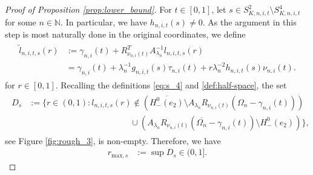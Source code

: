 \documentclass[11pt]{article}
\numberwithin{statement}{section}
\numberwithin{equation}{section}
\theoremstyle{remark}
\newcommand{\N}{\mathbb N}
\begin{document}
\begin{proof}[Proof of Proposition \ref{prop:lower_bound}]
        For $t\in [0,1]$, let
        $s \in S^2_{K,n,i,t} \setminus S^4_{K,n,i,t}$ for some
        $n \in \N$.  In particular, we have $h_{n,i,t}(s) \neq 0$.  As
        the argument in this step is most naturally done in the
        original coordinates, we define
        \begin{align}\label{eq:repr_line}
        \begin{split}
          \tilde l_{n,i,t,s}(r) & := \gamma_{n,i}(t) +
          R_{\nu_{n,i}(t)}^T
          A_{\lambda_n}^{-1} l_{n,i,t,s}(r) \\
          & = \gamma_{n,i}(t) + \lambda_n^{-1} g_{n,i,t}(s)
          \tau_{n,i}(t) + r \lambda_n^{-2} h_{n,i,t}(s) \nu_{n,i}(t).
	\end{split}
      \end{align} 
      for $r\in [0,1]$. 
      Recalling the definitions \eqref{eq:s_4} and
      \eqref{def:half-space}, the set
        \begin{align}
        \begin{split}
          D_s & := \Big\{ r \in (0,1) : l_{n,i,t,s}(r) \not \in
          \left(\overline{H_-^0(e_2)}\setminus A_{\lambda_n}
            R_{\nu_{n,i} (t) } \left(\Omega_{n} -
              \gamma_{n,i}(t )\right) \right) \\
          & \qquad \qquad \qquad \qquad \qquad \qquad \cup
          \left(A_{\lambda_n} R_{\nu_{n,i} (t) }
            \left(\overline{\Omega_{n}} - \gamma_{n,i}(t
              )\right)\setminus H_-^0(e_2) \right) \Big\},
	  \end{split}
      	\end{align}
	see Figure \ref{fig:rough_3}, is non-empty.  Therefore, we
        have
          \begin{align}
            r_{\mathrm{max}, s} & :=  \sup D_{s} \in (0, 1].
         \end{align}
         

\end{proof}
\end{document}
